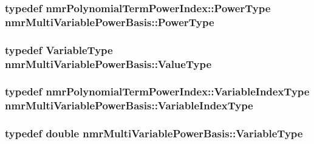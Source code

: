 \subsubsection[{Power\+Type}]{\setlength{\rightskip}{0pt plus 5cm}typedef {\bf nmr\+Polynomial\+Term\+Power\+Index\+::\+Power\+Type} {\bf nmr\+Multi\+Variable\+Power\+Basis\+::\+Power\+Type}}\label{classnmr_multi_variable_power_basis_a2cb67df83e9fcac213848fa7a7295fcc}
\hypertarget{classnmr_multi_variable_power_basis_af4a74a68c8bac235645e3f37f2f464e5}{}
\subsubsection[{Value\+Type}]{\setlength{\rightskip}{0pt plus 5cm}typedef {\bf Variable\+Type} {\bf nmr\+Multi\+Variable\+Power\+Basis\+::\+Value\+Type}}\label{classnmr_multi_variable_power_basis_af4a74a68c8bac235645e3f37f2f464e5}
\hypertarget{classnmr_multi_variable_power_basis_ae125326a623043fcfd020aeeefd1cce6}{}
\subsubsection[{Variable\+Index\+Type}]{\setlength{\rightskip}{0pt plus 5cm}typedef {\bf nmr\+Polynomial\+Term\+Power\+Index\+::\+Variable\+Index\+Type} {\bf nmr\+Multi\+Variable\+Power\+Basis\+::\+Variable\+Index\+Type}}\label{classnmr_multi_variable_power_basis_ae125326a623043fcfd020aeeefd1cce6}
\hypertarget{classnmr_multi_variable_power_basis_a7089007a79cce8d2eb3672e2d61af06c}{}
\subsubsection[{Variable\+Type}]{\setlength{\rightskip}{0pt plus 5cm}typedef double {\bf nmr\+Multi\+Variable\+Power\+Basis\+::\+Variable\+Type}}\label{classnmr_multi_variable_power_basis_a7089007a79cce8d2eb3672e2d61af06c}


